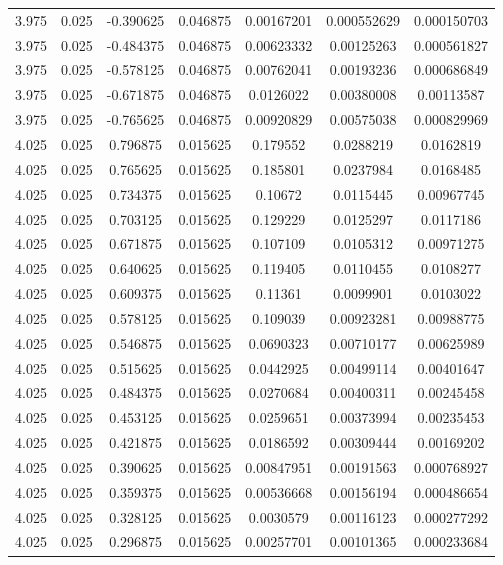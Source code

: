 \begin{flushleft}
\begin{longtable}{ccccccc}
3.975 & 0.025 & -0.390625 & 0.046875 & 0.00167201 & 0.000552629 & 0.000150703  \\ 
3.975 & 0.025 & -0.484375 & 0.046875 & 0.00623332 & 0.00125263 & 0.000561827  \\ 
3.975 & 0.025 & -0.578125 & 0.046875 & 0.00762041 & 0.00193236 & 0.000686849  \\ 
3.975 & 0.025 & -0.671875 & 0.046875 & 0.0126022 & 0.00380008 & 0.00113587  \\ 
3.975 & 0.025 & -0.765625 & 0.046875 & 0.00920829 & 0.00575038 & 0.000829969  \\ 
4.025 & 0.025 & 0.796875 & 0.015625 & 0.179552 & 0.0288219 & 0.0162819  \\ 
4.025 & 0.025 & 0.765625 & 0.015625 & 0.185801 & 0.0237984 & 0.0168485  \\ 
4.025 & 0.025 & 0.734375 & 0.015625 & 0.10672 & 0.0115445 & 0.00967745  \\ 
4.025 & 0.025 & 0.703125 & 0.015625 & 0.129229 & 0.0125297 & 0.0117186  \\ 
4.025 & 0.025 & 0.671875 & 0.015625 & 0.107109 & 0.0105312 & 0.00971275  \\ 
4.025 & 0.025 & 0.640625 & 0.015625 & 0.119405 & 0.0110455 & 0.0108277  \\ 
4.025 & 0.025 & 0.609375 & 0.015625 & 0.11361 & 0.0099901 & 0.0103022  \\ 
4.025 & 0.025 & 0.578125 & 0.015625 & 0.109039 & 0.00923281 & 0.00988775  \\ 
4.025 & 0.025 & 0.546875 & 0.015625 & 0.0690323 & 0.00710177 & 0.00625989  \\ 
4.025 & 0.025 & 0.515625 & 0.015625 & 0.0442925 & 0.00499114 & 0.00401647  \\ 
4.025 & 0.025 & 0.484375 & 0.015625 & 0.0270684 & 0.00400311 & 0.00245458  \\ 
4.025 & 0.025 & 0.453125 & 0.015625 & 0.0259651 & 0.00373994 & 0.00235453  \\ 
4.025 & 0.025 & 0.421875 & 0.015625 & 0.0186592 & 0.00309444 & 0.00169202  \\ 
4.025 & 0.025 & 0.390625 & 0.015625 & 0.00847951 & 0.00191563 & 0.000768927  \\ 
4.025 & 0.025 & 0.359375 & 0.015625 & 0.00536668 & 0.00156194 & 0.000486654  \\ 
4.025 & 0.025 & 0.328125 & 0.015625 & 0.0030579 & 0.00116123 & 0.000277292  \\ 
4.025 & 0.025 & 0.296875 & 0.015625 & 0.00257701 & 0.00101365 & 0.000233684  \\ 

\end{longtable}
\end{flushleft}
